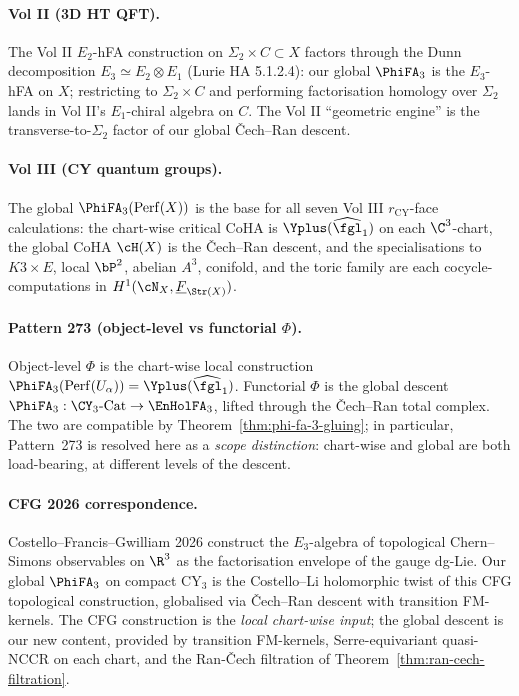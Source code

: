 \paragraph{Vol II (3D HT QFT).} The Vol II $E_2$-hFA construction on
$\Sigma_2 \times C \subset X$ factors through the Dunn decomposition
$E_3 \simeq E_2 \otimes E_1$ (Lurie HA 5.1.2.4): our global
$\PhiFA_3$ is the $E_3$-hFA on $X$; restricting to $\Sigma_2 \times C$
and performing factorisation homology over $\Sigma_2$ lands in
Vol II's $E_1$-chiral algebra on $C$. The Vol II ``geometric engine''
is the transverse-to-$\Sigma_2$ factor of our global Čech--Ran
descent.

\paragraph{Vol III (CY quantum groups).} The global
$\PhiFA_3(\mathrm{Perf}(X))$ is the base for all seven Vol III
$r_{\mathrm{CY}}$-face calculations: the chart-wise critical CoHA is
$\Yplus(\widehat{\fgl}_1)$ on each $\C^3$-chart, the global
CoHA $\cH(X)$ is the Čech--Ran descent, and the
specialisations to $K3 \times E$, local $\bP^2$, abelian $A^3$,
conifold, and the toric family are each cocycle-computations in
$H^1(\cN_X, \underline{F}_{\Str(X)})$.

\paragraph{Pattern 273 (object-level vs functorial $\Phi$).} Object-level
$\Phi$ is the chart-wise local construction
$\PhiFA_3(\mathrm{Perf}(U_\alpha)) = \Yplus(\widehat{\fgl}_1)$.
Functorial $\Phi$ is the global descent
$\PhiFA_3: \CY_3\text{-Cat} \to \EnHolFA_3$, lifted through the
Čech--Ran total complex. The two are compatible by
Theorem~\ref{thm:phi-fa-3-gluing}; in particular, Pattern~273 is
resolved here as a \emph{scope distinction}: chart-wise and
global are both load-bearing, at different levels of the descent.

\paragraph{CFG 2026 correspondence.} Costello--Francis--Gwilliam 2026
construct the $E_3$-algebra of topological Chern--Simons observables
on $\R^3$ as the factorisation envelope of the gauge dg-Lie.
Our global $\PhiFA_3$ on compact CY$_3$ is the Costello--Li
holomorphic twist of this CFG topological construction, globalised
via Čech--Ran descent with transition FM-kernels. The CFG
construction is the \emph{local chart-wise input}; the global
descent is our new content, provided by transition FM-kernels,
Serre-equivariant quasi-NCCR on each chart, and the Ran-Čech
filtration of Theorem~\ref{thm:ran-cech-filtration}.

